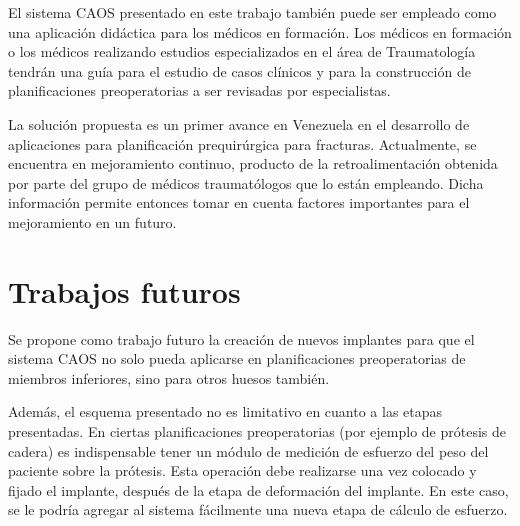 El sistema CAOS presentado en este trabajo tambi\'en puede ser empleado como una aplicaci\'on did\'actica para los m\'edicos en formaci\'on. Los m\'edicos en formaci\'on o los m\'edicos realizando estudios especializados en el \'area de Traumatolog\'ia tendr\'an una gu\'ia para el estudio de casos cl\'inicos y para la construcci\'on de planificaciones preoperatorias a ser revisadas por especialistas.

La soluci\'on propuesta es un primer avance en Venezuela en el desarrollo de aplicaciones para planificaci\'on prequir\'urgica para fracturas. Actualmente, se encuentra en mejoramiento continuo, producto de la retroalimentaci\'on obtenida por parte del grupo de m\'edicos traumat\'ologos que lo est\'an empleando. Dicha informaci\'on permite entonces tomar en cuenta factores importantes para el mejoramiento en un futuro.

\section{Trabajos futuros}

Se propone como trabajo futuro la creaci\'on de nuevos implantes para que el sistema CAOS no solo pueda aplicarse en planificaciones preoperatorias de miembros inferiores, sino para otros huesos tambi\'en. 

Adem\'as, el esquema presentado no es limitativo en cuanto a las etapas presentadas. En ciertas planificaciones preoperatorias (por ejemplo de pr\'otesis de cadera) es indispensable tener un m\'odulo de medici\'on de esfuerzo del peso del paciente sobre la pr\'otesis. Esta operaci\'on debe realizarse una vez colocado y fijado el implante, despu\'es de la etapa de deformaci\'on del implante. En este caso, se le podr\'ia agregar al sistema f\'acilmente una nueva etapa de c\'alculo de esfuerzo. 

